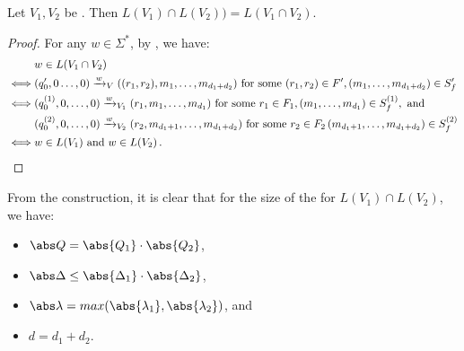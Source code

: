 \begin{corollary}
  Let $V_1,V_2$ be \laVASS. Then $L(V_1)\cap L(V_2))=L(V_1\cap V_2)$.
\end{corollary}
\begin{proof}
  For any $w\in\Sigma^*$, by , we have:
  \begin{align*}
    & w\in L(V_1\cap V_2)\\
    \iff & (q_0',0\dots,0)\xrightarrow{w}_V((r_1,r_2),m_1,\dots,m_{d_1+d_2}) \text{
      for some } (r_1,r_2)\in F', (m_1,\dots,m_{d_1+d_2})\in S_f'\\
    \iff & (q_0^{(1)},0,\dots,0)\xrightarrow{w}_{V_1}
    (r_1,m_1,\dots,m_{d_1}) \text{ for some } r_1\in F_1, (m_1,\dots,m_{d_1})\in
    S_f^{(1)}, \text{ and }\\
    & (q_0^{(2)},0,\dots,0)\xrightarrow{w}_{V_2} (r_2, m_{d_1+1},\dots,m_{d_1+d_2}) \text{
      for some } r_2\in F_2\, (m_{d_1+1},\dots, m_{d_1+d_2})\in
    S_f^{(2)}\\
    \iff & w \in L(V_1) \text{ and } w\in L(V_2)\,.\qedhere
  \end{align*}
\end{proof}


From the construction, it is clear that for the size of the \laVASS
for $L(V_1)\cap L(V_2)$, we have:
%
\begin{itemize}
\item $\abs Q = \abs{Q_1} \cdot \abs{Q_2}$,
\item $\abs \Delta \le \abs{\Delta_1}\cdot \abs{\Delta_2}$, 
\item $\abs \lambda = max(\abs{\lambda_1}, \abs{\lambda_2})$, and
\item $d=d_1+d_2$.
\end{itemize}
